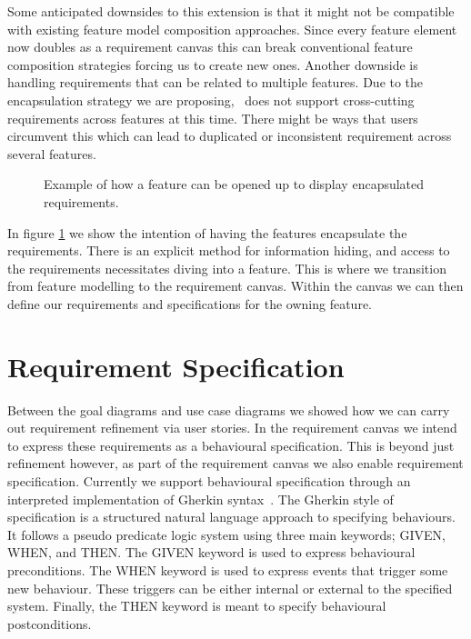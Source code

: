 Some anticipated downsides to this extension is that it might not be compatible with existing feature model composition approaches. Since every feature element now doubles as a requirement canvas this can break conventional feature composition strategies forcing us to create new ones. Another downside is handling requirements that can be related to multiple features. Due to the encapsulation strategy we are proposing, \tool\ does not support cross-cutting requirements across features at this time. There might be ways that users circumvent this which can lead to duplicated or inconsistent requirement across several features. 

\begin{figure}
	\centering
	
	\caption{Example of how a feature can be opened up to display encapsulated requirements.}
	\label{fig:feature-requirement}
\end{figure}

In figure \ref{fig:feature-requirement} we show the intention of having the features encapsulate the requirements. There is an explicit method for information hiding, and access to the requirements necessitates diving into a feature. This is where we transition from feature modelling to the requirement canvas. Within the canvas we can then define our requirements and specifications for the owning feature. 

\section{Requirement Specification}

Between the goal diagrams and use case diagrams we showed how we can carry out requirement refinement via user stories. In the requirement canvas we intend to express these requirements as a behavioural specification. This is beyond just refinement however, as part of the requirement canvas we also enable requirement specification. Currently we support behavioural specification through an interpreted implementation of Gherkin syntax~\cite{cucumberdocs}. The Gherkin style of specification is a structured natural language approach to specifying behaviours. It follows a pseudo predicate logic system using three main keywords; GIVEN, WHEN, and THEN. The GIVEN keyword is used to express behavioural preconditions. The WHEN keyword is used to express events that trigger some new behaviour. These triggers can be either internal or external to the specified system. Finally, the THEN keyword is meant to specify behavioural postconditions. 

